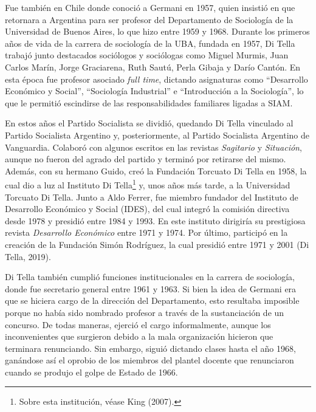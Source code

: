 Fue también en Chile donde conoció a Germani en 1957, quien insistió en que retornara a Argentina para ser profesor del Departamento de Sociología de la Universidad de Buenos Aires, lo que hizo entre 1959 y 1968. Durante los primeros años de vida de la carrera de sociología de la UBA, fundada en 1957, Di Tella trabajó junto destacados sociólogos y sociólogas como Miguel Murmis, Juan Carlos Marín, Jorge Graciarena, Ruth Sautú, Perla Gibaja y Darío Cantón. En esta época fue profesor asociado \emph{full time}, dictando asignaturas como \enquote{Desarrollo Económico y Social}, \enquote{Sociología Industrial} e \enquote{Introducción a la Sociología}, lo que le permitió escindirse de las responsabilidades familiares ligadas a SIAM.

En estos años el Partido Socialista se dividió, quedando Di Tella vinculado al Partido Socialista Argentino y, posteriormente, al Partido Socialista Argentino de Vanguardia. Colaboró con algunos escritos en las revistas \emph{Sagitario} y \emph{Situación}, aunque no fueron del agrado del partido y terminó por retirarse del mismo. Además, con su hermano Guido, creó la Fundación Torcuato Di Tella en 1958, la cual dio a luz al Instituto Di Tella\footnote{Sobre esta institución, véase \textcite{1629-GARCIA2021} King (2007).} y, unos años más tarde, a la Universidad Torcuato Di Tella. Junto a Aldo Ferrer, fue miembro fundador del Instituto de Desarrollo Económico y Social (IDES), del cual integró la comisión directiva desde 1978 y presidió entre 1984 y 1993. En este instituto dirigiría su prestigiosa revista \emph{Desarrollo Económico} entre 1971 y 1974. Por último, participó en la creación de la Fundación Simón Rodríguez, la cual presidió entre 1971 y 2001 \parencite{1553-CAMOU2009}(Di Tella, 2019).

Di Tella también cumplió funciones institucionales en la carrera de sociología, donde fue secretario general entre 1961 y 1963. Si bien la idea de Germani era que se hiciera cargo de la dirección del Departamento, esto resultaba imposible porque no había sido nombrado profesor a través de la sustanciación de un concurso. De todas maneras, ejerció el cargo informalmente, aunque los inconvenientes que surgieron debido a la mala organización hicieron que terminara renunciando. Sin embargo, siguió dictando clases hasta el año 1968, ganándose así el oprobio de los miembros del plantel docente que renunciaron cuando se produjo el golpe de Estado de 1966.

